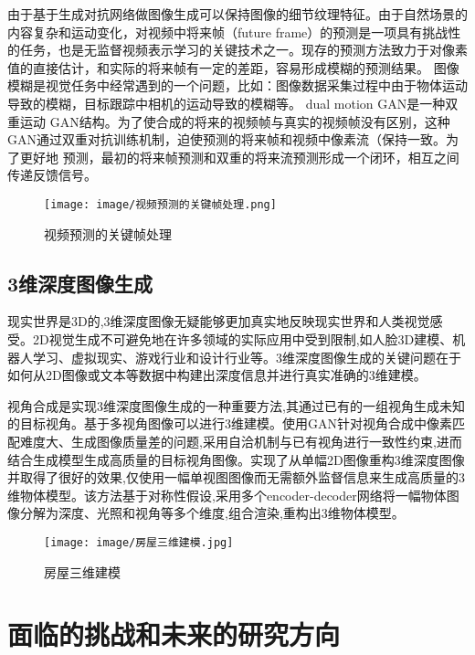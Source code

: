 \documentclass[lang=cn,a4paper,12pt,bibend=biber]{GAN}
\begin{document}
由于基于生成对抗网络做图像生成可以保持图像的细节纹理特征。由于自然场景的内容复杂和运动变化，对视频中将来帧（future frame）的预测是一项具有挑战性的任务，也是无监督视频表示学习的关键技术之一。现存的预测方法致力于对像素值的直接估计，和实际的将来帧有一定的差距，容易形成模糊的预测结果。
图像模糊是视觉任务中经常遇到的一个问题，比如：图像数据采集过程中由于物体运动导致的模糊，目标跟踪中相机的运动导致的模糊等。
dual motion GAN是一种双重运动 GAN结构。为了使合成的将来的视频帧与真实的视频帧没有区别，这种GAN通过双重对抗训练机制，迫使预测的将来帧和视频中像素流（保持一致。为了更好地 预测，最初的将来帧预测和双重的将来流预测形成一个闭环，相互之间传递反馈信号。

\begin{figure}[!htbp]
  \centering
  \texttt{[image: image/视频预测的关键帧处理.png]}
  \caption[]{视频预测的关键帧处理}
  \label{fig:视频预测的关键帧处理}
\end{figure}

\subsection{3维深度图像生成}

现实世界是3D的,3维深度图像无疑能够更加真实地反映现实世界和人类视觉感受。2D视觉生成不可避免地在许多领域的实际应用中受到限制,如人脸3D建模、机器人学习、虚拟现实、游戏行业和设计行业等。3维深度图像生成的关键问题在于如何从2D图像或文本等数据中构建出深度信息并进行真实准确的3维建模。

视角合成是实现3维深度图像生成的一种重要方法,其通过已有的一组视角生成未知的目标视角。基于多视角图像可以进行3维建模。使用GAN针对视角合成中像素匹配难度大、生成图像质量差的问题,采用自洽机制与已有视角进行一致性约束,进而结合生成模型生成高质量的目标视角图像。实现了从单幅2D图像重构3维深度图像并取得了很好的效果,仅使用一幅单视图图像而无需额外监督信息来生成高质量的3维物体模型。该方法基于对称性假设,采用多个encoder-decoder网络将一幅物体图像分解为深度、光照和视角等多个维度,组合渲染,重构出3维物体模型。

\begin{figure}[!htbp]
  \centering
  \texttt{[image: image/房屋三维建模.jpg]}
  \caption[]{房屋三维建模}
  \label{fig:房屋三维建模}
\end{figure}

\section{面临的挑战和未来的研究方向}
\end{document}
